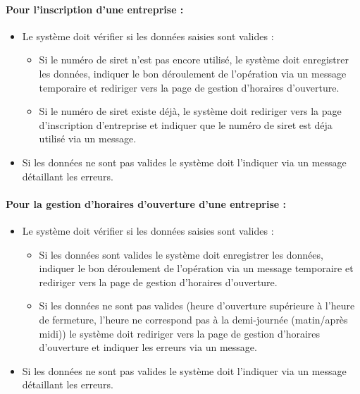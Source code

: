 \documentclass{article}
\begin{document}
\paragraph{Pour l'inscription d'une entreprise : }
\begin{itemize}
\item Le système doit vérifier si les données saisies sont valides :

		\begin{itemize}
		\item Si le numéro de siret n'est pas encore utilisé, le système
			doit enregistrer les données, indiquer le bon déroulement de l'opération via un message temporaire et rediriger vers la page de gestion d'horaires d'ouverture.
		\item Si le numéro de siret existe déjà, le système doit rediriger vers
			la page d'inscription d'entreprise et indiquer que le numéro de siret est déja utilisé
			via un message.
		\end{itemize}

\item Si les données ne sont pas valides le système doit l'indiquer
	via un message détaillant les erreurs.
\end{itemize}

\paragraph{Pour la gestion d'horaires d'ouverture d'une entreprise : }
\begin{itemize}
\item Le système doit vérifier si les données saisies sont valides :

		\begin{itemize}
    	\item Si les données sont valides le système
			doit enregistrer les données, indiquer le bon déroulement de l'opération via un message temporaire et rediriger vers la page de gestion d'horaires d'ouverture.
		\item Si les données ne sont pas valides (heure d'ouverture supérieure à l'heure de fermeture, l'heure ne correspond pas à la demi-journée (matin/après midi)) le système doit rediriger vers
			la page de gestion d'horaires d'ouverture et indiquer les erreurs
			via un message.
		\end{itemize}

\item Si les données ne sont pas valides le système doit l'indiquer
	via un message détaillant les erreurs.
\end{itemize}
\end{document}

